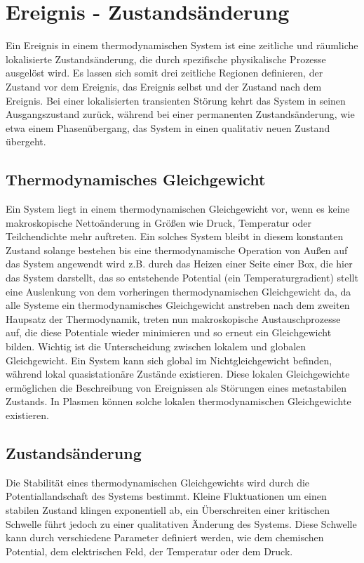 \section{Ereignis - Zustandsänderung}
\label{sec:theory-event}

Ein Ereignis in einem thermodynamischen System ist eine zeitliche und räumliche lokalisierte Zustandsänderung, die durch spezifische physikalische Prozesse ausgelöst wird. Es lassen sich somit drei zeitliche Regionen definieren, der Zustand vor dem Ereignis, das Ereignis selbst und der Zustand nach dem Ereignis. Bei einer lokalisierten transienten Störung kehrt das System in seinen Ausgangszustand zurück, während bei einer permanenten Zustandsänderung, wie etwa einem Phasenübergang, das System in einen qualitativ neuen Zustand übergeht.

\subsection{Thermodynamisches Gleichgewicht}
Ein System liegt in einem thermodynamischen Gleichgewicht vor, wenn es keine makroskopische Nettoänderung in Größen wie Druck, Temperatur oder Teilchendichte mehr auftreten. Ein solches System bleibt in diesem konstanten Zustand solange bestehen bis eine thermodynamische Operation von Außen auf das System angewendt wird z.B. durch das Heizen einer Seite einer Box, die hier das System darstellt, das so entstehende Potential (ein Temperaturgradient) stellt eine Auslenkung von dem vorheringen thermodynamischen Gleichgewicht da, da alle Systeme ein thermodynamisches Gleichgewicht anstreben nach dem zweiten Haupsatz der Thermodynamik, treten nun makroskopische Austauschprozesse auf, die diese Potentiale wieder minimieren und so erneut ein Gleichgewicht bilden. 
Wichtig ist die Unterscheidung zwischen lokalem und globalen Gleichgewicht. Ein System kann sich global im Nichtgleichgewicht befinden, während lokal quasistationäre Zustände existieren. Diese lokalen Gleichgewichte ermöglichen die Beschreibung von Ereignissen als Störungen eines metastabilen Zustands. In Plasmen können solche lokalen thermodynamischen Gleichgewichte existieren. \cite{Lieberman2005}

\subsection{Zustandsänderung}
Die Stabilität eines thermodynamischen Gleichgewichts wird durch die Potentiallandschaft des Systems bestimmt. Kleine Fluktuationen um einen stabilen Zustand klingen exponentiell ab, ein Überschreiten einer kritischen Schwelle führt jedoch zu einer qualitativen Änderung des Systems. Diese Schwelle kann durch verschiedene Parameter definiert werden, wie dem chemischen Potential, dem elektrischen Feld, der Temperatur oder dem Druck.

